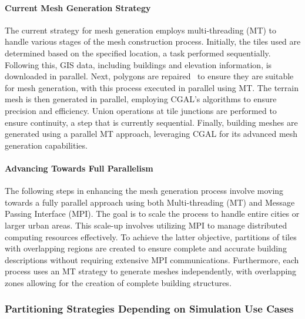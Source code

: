 \documentclass[runningheads]{llncs}
\begin{document}
\paragraph{Current Mesh Generation Strategy}
The current strategy for mesh generation employs multi-threading (MT) to handle various stages of the mesh construction process. Initially, the tiles used are determined based on the specified location, a task performed sequentially. Following this, GIS data, including buildings and elevation information, is downloaded in parallel. Next, polygons are repaired~\cite{loriot_polygon_2024} to ensure they are suitable for mesh generation, with this process executed in parallel using MT. The terrain mesh is then generated in parallel, employing CGAL's algorithms to ensure precision and efficiency. Union operations at tile junctions are performed to ensure continuity, a step that is currently sequential. Finally, building meshes are generated using a parallel MT approach, leveraging CGAL for its advanced mesh generation capabilities.

\paragraph{Advancing Towards Full Parallelism}
The following steps in enhancing the mesh generation process involve moving towards a fully parallel approach using both Multi-threading (MT) and Message Passing Interface (MPI). The goal is to scale the process to handle entire cities or larger urban areas. This scale-up involves utilizing MPI to manage distributed computing resources effectively. To achieve the latter objective, partitions of tiles with overlapping regions are created to ensure complete and accurate building descriptions without requiring extensive MPI communications. Furthermore, each process uses an MT strategy to generate meshes independently, with overlapping zones allowing for the creation of complete building structures.

\subsubsection{Partitioning Strategies Depending on Simulation Use Cases}
\end{document}
